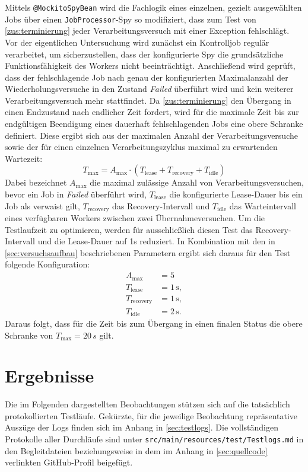 Mittels \texttt{@MockitoSpyBean} wird die Fachlogik eines einzelnen, gezielt ausgewählten Jobs über einen \texttt{JobProcessor}-Spy
so modifiziert, dass zum Test von \ref{zus:terminierung} jeder Verarbeitungsversuch mit einer Exception fehlschlägt.
Vor der eigentlichen Untersuchung wird zunächst ein Kontrolljob regulär verarbeitet, um sicherzustellen, dass der konfigurierte
Spy die grundsätzliche Funktionsfähigkeit des Workers nicht beeinträchtigt.
Anschließend wird geprüft, dass der fehlschlagende Job nach genau der konfigurierten Maximalanzahl der Wiederholungsversuche
in den Zustand \textit{Failed} überführt wird und kein weiterer Verarbeitungsversuch mehr stattfindet.
Da \ref{zus:terminierung} den Übergang in einen Endzustand nach endlicher Zeit fordert, wird für die maximale Zeit bis
zur endgültigen Beendigung eines dauerhaft fehlschlagenden Jobs eine obere Schranke definiert.
Diese ergibt sich aus der maximalen Anzahl der Verarbeitungsversuche sowie der für einen einzelnen Verarbeitungszyklus maximal
zu erwartenden Wartezeit:
\[
    T_{\mathrm{max}}
    =
    A_{\mathrm{max}}
    \cdot
    \left(
        T_{\mathrm{lease}}
        +
        T_{\mathrm{recovery}}
        +
        T_{\mathrm{idle}}
    \right)
\]
Dabei bezeichnet \(A_{\mathrm{max}}\) die maximal zulässige Anzahl von Verarbeitungsversuchen, bevor ein Job in \textit{Failed} überführt wird,
\(T_{\mathrm{lease}}\) die konfigurierte Lease-Dauer bis ein Job als verwaist gilt,
\(T_{\mathrm{recovery}}\) das Recovery-Intervall und
\(T_{\mathrm{idle}}\) das Warteintervall eines verfügbaren Workers zwischen zwei Übernahmeversuchen.
Um die Testlaufzeit zu optimieren, werden für ausschließlich diesen Test das Recovery-Intervall und die Lease-Dauer auf 1s reduziert.
In Kombination mit den in \cref{sec:versuchsaufbau} beschriebenen Parametern ergibt sich daraus für den Test folgende Konfiguration:
\begin{align*}
    A_{\mathrm{max}} &= 5\\
    T_{\mathrm{lease}} &= 1\,\mathrm{s},\\
    T_{\mathrm{recovery}} &= 1\,\mathrm{s},\\
    T_{\mathrm{idle}} &= 2\,\mathrm{s}.
\end{align*}
Daraus folgt, dass für die Zeit bis zum Übergang in einen finalen Status die obere Schranke von \(T_{\mathrm{max}} = 20\,s\) gilt.

\section{Ergebnisse}
\label{sec:ergebnisse}
Die im Folgenden dargestellten Beobachtungen stützen sich auf die tatsächlich protokollierten Testläufe.
Gekürzte, für die jeweilige Beobachtung repräsentative Auszüge der Logs finden sich im Anhang in \cref{sec:testlogs}.
Die vollständigen Protokolle aller Durchläufe sind unter \texttt{src/main/resources/test/Testlogs.md} in den Begleitdateien
beziehungsweise in dem im Anhang in \cref{sec:quellcode} verlinkten GitHub-Profil beigefügt.


